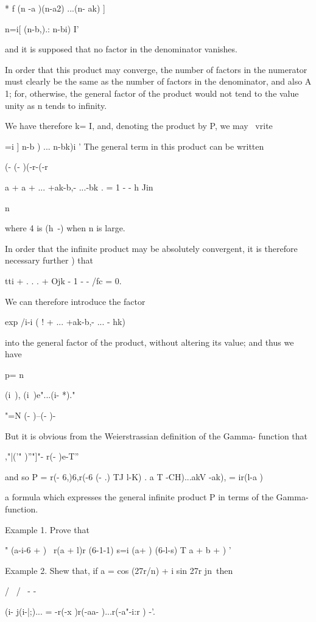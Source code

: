 * f (n -a )(n-a2) ...(n- ak) ]

n=i[ (n-b,).: n-bi) I'

and it is supposed that no factor in the denominator vanishes.

In order that this product may converge, the number of factors in the
numerator must clearly be the same as the number of factors in the
denominator, and also A 1; for, otherwise, the general factor of the
product would not tend to the value unity as n tends to infinity.

We have therefore k= I, and, denoting the product by P, we may \ vrite

 =i ] n-b ) ... n-bk)i ' The general term in this product can be
written

(- (- )(-r-(-r

a + a + ... +ak-b,- ...-bk . = 1 - - h Jin

n

where 4 is (h~-) when n is large.

In order that the infinite product may be absolutely convergent, it is
therefore necessary further ) that

tti + . . . + Ojk - 1 -   - /fc = 0.

%
%

We can therefore introduce the factor

exp /i-i ( ! + ... +ak-b,- ... - hk)

into the general factor of the product, without altering its value;
and thus we have

p= n

(i\ ), (i\ )e"...(i- *)."

"=N (- )--(- )-

But it is obvious from the Weierstrassian definition of the Gamma-
function that

,"|('" )''"]"- r(- )e-T''

and so P = r(- 6,)6,r(-6 (- .) TJ l-K) . a T -CH)...akV -ak), =
ir(l-a )

a formula which expresses the general infinite product P in terms of
the Gamma-function.

Example 1. Prove that

 " (a-i-6 + ) \ r(a + l)r (6-1-1) s=i (a+ ) (6-l-s) T a + b + ) '

Example 2. Shew that, if a = cos (27r/n) + i sin 27r jn\ then

/ \ / \ - -

 (i- j(i-|;)... = -r(-x )r(-aa- )...r(-a"-i:r ) -'.

